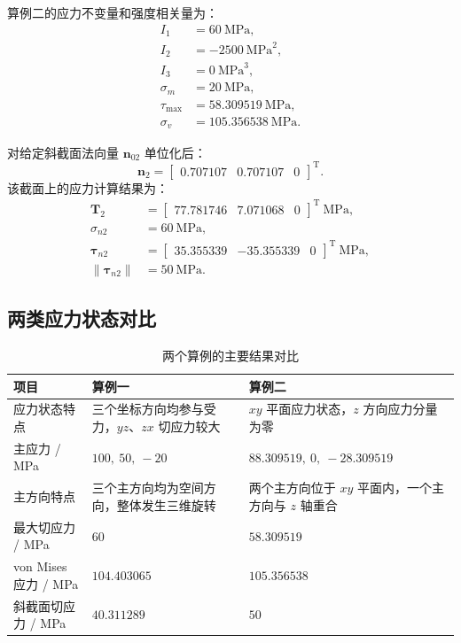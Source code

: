\documentclass[UTF8,a4paper,12pt]{ctexart}
\newcommand{\vect}[1]{\bm{#1}}
\begin{document}
算例二的应力不变量和强度相关量为：
\begin{align}
I_1 &= 60\ \mathrm{MPa},\\
I_2 &= -2500\ \mathrm{MPa}^2,\\
I_3 &= 0\ \mathrm{MPa}^3,\\
\sigma_m &= 20\ \mathrm{MPa},\\
\tau_{\max} &= 58.309519\ \mathrm{MPa},\\
\sigma_v &= 105.356538\ \mathrm{MPa}.
\end{align}

对给定斜截面法向量 $\vect n_{02}$ 单位化后：
\begin{equation}
\vect n_2=\begin{bmatrix}0.707107 & 0.707107 & 0\end{bmatrix}^{\mathrm T}.
\end{equation}
该截面上的应力计算结果为：
\begin{align}
\vect T_2 &= \begin{bmatrix}77.781746 & 7.071068 & 0\end{bmatrix}^{\mathrm T}\ \mathrm{MPa},\\
\sigma_{n2} &= 60\ \mathrm{MPa},\\
\vect\tau_{n2} &= \begin{bmatrix}35.355339 & -35.355339 & 0\end{bmatrix}^{\mathrm T}\ \mathrm{MPa},\\
\lVert\vect\tau_{n2}\rVert &= 50\ \mathrm{MPa}.
\end{align}

\subsection{两类应力状态对比}

\begin{table}[H]
\centering
\caption{两个算例的主要结果对比}
\label{tab:case_compare}
\small
\begin{tabular}{p{}p{}p{}}
\toprule
项目 & 算例一 & 算例二 \\
\midrule
应力状态特点 & 三个坐标方向均参与受力，$yz$、$zx$ 切应力较大 & $xy$ 平面应力状态，$z$ 方向应力分量为零 \\
主应力 / MPa & $100,\ 50,\ -20$ & $88.309519,\ 0,\ -28.309519$ \\
主方向特点 & 三个主方向均为空间方向，整体发生三维旋转 & 两个主方向位于 $xy$ 平面内，一个主方向与 $z$ 轴重合 \\
最大切应力 / MPa & $60$ & $58.309519$ \\
von Mises 应力 / MPa & $104.403065$ & $105.356538$ \\
斜截面切应力 / MPa & $40.311289$ & $50$ \\
\bottomrule
\end{tabular}
\end{table}
\end{document}
